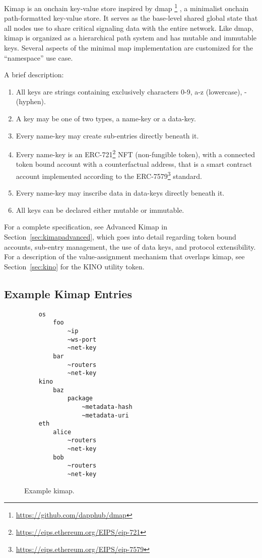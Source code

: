 \documentclass[runningheads]{llncs}
\begin{document}
Kimap is an onchain key-value store inspired by dmap
\footnote{\url{https://github.com/dapphub/dmap}}
, a minimalist onchain path-formatted key-value store.
It serves as the base-level shared global state that all nodes use to share critical signaling data with the entire network.
Like dmap, kimap is organized as a hierarchical path system and has mutable and immutable keys.
Several aspects of the minimal map implementation are customized for the ``namespace'' use case.

A brief description:

\begin{enumerate}
    \item All keys are strings containing exclusively characters 0-9, a-z (lowercase), - (hyphen).
    \item A key may be one of two types, a name-key or a data-key.
    \item Every name-key may create sub-entries directly beneath it.
    \item Every name-key is an ERC-721\footnote{\url{https://eips.ethereum.org/EIPS/eip-721}} NFT (non-fungible token),
    with a connected token bound account with a counterfactual address,
    that is a smart contract account implemented according to the ERC-7579\footnote{\url{https://eips.ethereum.org/EIPS/eip-7579}} standard.
    \item Every name-key may inscribe data in data-keys directly beneath it.
    \item All keys can be declared either mutable or immutable.
\end{enumerate}

For a complete specification, see Advanced Kimap in Section~\ref{sec:kimapadvanced}, which goes into detail regarding token bound accounts, sub-entry management, the use of data keys, and protocol extensibility.
For a description of the value-assignment mechanism that overlaps kimap, see Section~\ref{sec:kino} for the KINO utility token.

\subsection{Example Kimap Entries}

\begin{figure}[H]
    \centering
    \begin{verbatim}
    os
        foo
            ~ip
            ~ws-port
            ~net-key
        bar
            ~routers
            ~net-key
    kino
        baz
            package
                ~metadata-hash
                ~metadata-uri
    eth
        alice
            ~routers
            ~net-key
        bob
            ~routers
            ~net-key
    \end{verbatim}
    \caption{Example kimap.}
    \label{fig:example kimap}
\end{figure}
\end{document}

